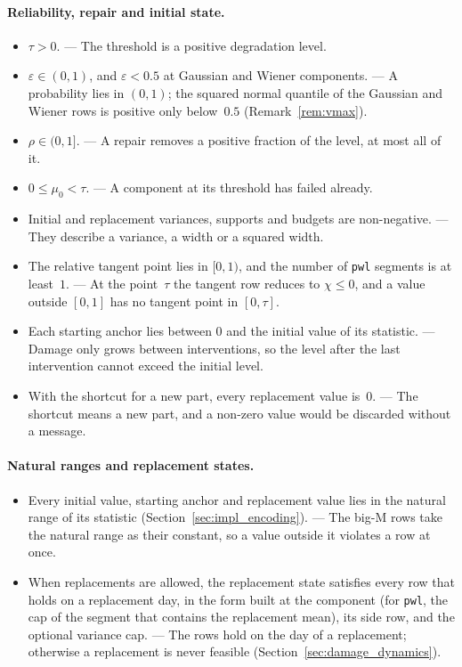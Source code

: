 \documentclass[11pt,a4paper]{article}
\theoremstyle{plain}
\theoremstyle{definition}
\theoremstyle{remark}
\begin{document}
\paragraph{Reliability, repair and initial state.}
\begin{itemize}[nosep]
  \item $\tau > 0$. --- The threshold is a positive degradation level.
  \item $\varepsilon \in (0, 1)$, and $\varepsilon < 0.5$ at Gaussian and Wiener components. --- A probability lies in $(0,1)$; the squared normal quantile of the Gaussian and Wiener rows is positive only below~$0.5$ (Remark~\ref{rem:vmax}).
  \item $\rho \in (0, 1]$. --- A repair removes a positive fraction of the level, at most all of it.
  \item $0 \le \mu_0 < \tau$. --- A component at its threshold has failed already.
  \item Initial and replacement variances, supports and budgets are non-negative. --- They describe a variance, a width or a squared width.
  \item The relative tangent point lies in $[0, 1)$, and the number of \texttt{pwl} segments is at least~$1$. --- At the point~$\tau$ the tangent row reduces to $\chi \le 0$, and a value outside $[0,1]$ has no tangent point in $[0, \tau]$.
  \item Each starting anchor lies between $0$ and the initial value of its statistic. --- Damage only grows between interventions, so the level after the last intervention cannot exceed the initial level.
  \item With the shortcut for a new part, every replacement value is~$0$. --- The shortcut means a new part, and a non-zero value would be discarded without a message.
\end{itemize}

\paragraph{Natural ranges and replacement states.}
\begin{itemize}[nosep]
  \item Every initial value, starting anchor and replacement value lies in the natural range of its statistic (Section~\ref{sec:impl_encoding}). --- The big-M rows take the natural range as their constant, so a value outside it violates a row at once.
  \item When replacements are allowed, the replacement state satisfies every row that holds on a replacement day, in the form built at the component (for \texttt{pwl}, the cap of the segment that contains the replacement mean), its side row, and the optional variance cap. --- The rows hold on the day of a replacement; otherwise a replacement is never feasible (Section~\ref{sec:damage_dynamics}).
\end{itemize}
\end{document}
